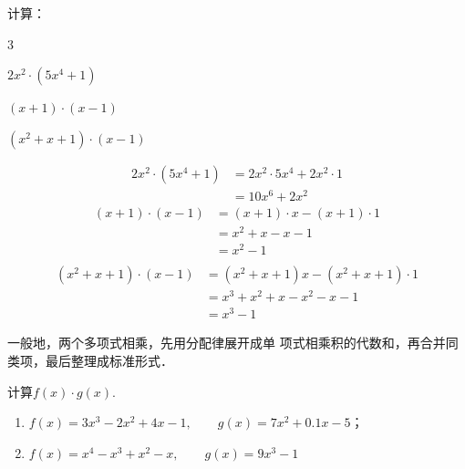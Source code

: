 \begin{example}
    计算：
    \begin{enumerate}
        \begin{multicols}{3}
              \item $2x^2\cdot (5x^4+1)$
        \item $(x+1)\cdot (x-1)$
        \item $(x^2+x+1)\cdot (x-1)$
        \end{multicols}
    \end{enumerate}   
\end{example}

\begin{solution}
\begin{align*}
    2x^2\cdot (5x^4+1)&=2x^2\cdot 5x^4+ 2x^2\cdot 1\tag{分配律}\\
    &=10x^6+2x^2
\end{align*}
\begin{align*}
    (x+1)\cdot (x-1)&=(x+1)\cdot x-  (x+1)\cdot 1 \tag{分配律}\\
    &=x^2+x-x-1  \tag{分配律}\\
    &=x^2-1 \tag{合并同类项}\\
\end{align*}   
\begin{align*}
    (x^2+x+1)\cdot (x-1)&=(x^2+x+1)x-(x^2+x+1)\cdot 1\\
    &=x^3+x^2+x-x^2-x-1\\
    &=x^3-1
\end{align*}
\end{solution}

一般地，两个多项式相乘，先用分配律展开成单
项式相乘积的代数和，再合并同类项，最后整理成标准形式．

\begin{example}
    计算$f(x)\cdot g(x)$.
    \begin{enumerate}
        \item $f(x)=3x^3-2x^2+4x-1,\qquad g(x)=7x^2+0.1x-5$；
        \item $f(x)=x^4-x^3+x^2-x,\qquad g(x)=9x^3-1$
    \end{enumerate} 
\end{example}

